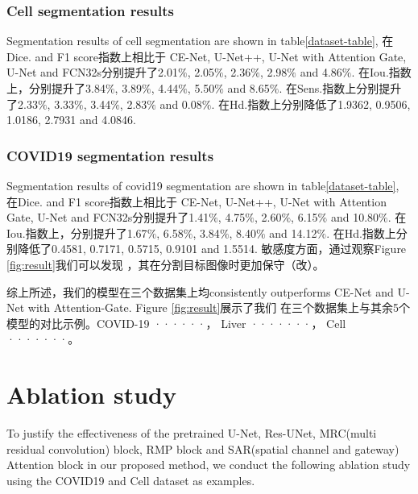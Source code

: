 \documentclass{ieeeaccess}
\begin{document}
\subsubsection{Cell segmentation results}
Segmentation results of cell segmentation are shown in table\ref{dataset-table}, 在Dice. and F1 score指数上相比于
CE-Net, U-Net++, U-Net with Attention Gate, U-Net and FCN32s分别提升了2.01\(\%\), 2.05\(\%\), 2.36\(\%\), 2.98\(\%\) and 4.86\(\%\).
在Iou.指数上，分别提升了3.84\(\%\), 3.89\(\%\), 4.44\(\%\), 5.50\(\%\) and 8.65\(\%\). 在Sens.指数上分别提升了2.33\(\%\), 3.33\(\%\), 3.44\(\%\), 
2.83\(\%\) and 0.08\(\%\). 在Hd.指数上分别降低了1.9362, 0.9506, 1.0186, 2.7931 and 4.0846.

  \subsubsection{COVID19 segmentation results}
  Segmentation results of covid19 segmentation are shown in table\ref{dataset-table}, 在Dice. and F1 score指数上相比于
  CE-Net, U-Net++, U-Net with Attention Gate, U-Net and FCN32s分别提升了1.41\(\%\), 4.75\(\%\), 2.60\(\%\), 6.15\(\%\) and 10.80\(\%\).
  在Iou.指数上，分别提升了1.67\(\%\), 6.58\(\%\), 3.84\(\%\), 8.40\(\%\) and 14.12\(\%\). %
  在Hd.指数上分别降低了0.4581, 0.7171, 0.5715, 0.9101 and 1.5514. 敏感度方面，通过观察Figure \ref{fig:result}我们可以发现
  ，其在分割目标图像时更加保守（改）。


  综上所述，我们的模型在三个数据集上均consistently outperforms CE-Net and U-Net with Attention-Gate. Figure \ref{fig:result}展示了我们
  在三个数据集上与其余5个模型的对比示例。COVID-19 ······， Liver ·······， Cell ·······。

  \section{Ablation study}
  To justify the effectiveness of the pretrained U-Net\cite{unet}, Res-UNet\cite{ResUNet}, 
  MRC(multi residual convolution) block, RMP block and SAR(spatial channel and gateway) Attention block
  in our proposed method, we conduct the following ablation study using the COVID19 and Cell dataset as examples.
\end{document}
